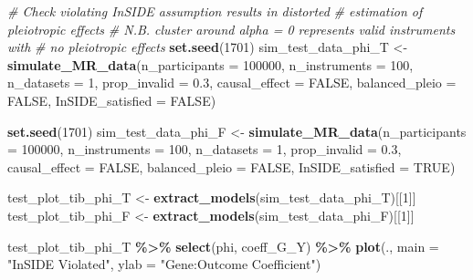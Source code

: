 \documentclass[
]{article}
\newenvironment{Shaded}{\begin{snugshade}}{\end{snugshade}}
\newcommand{\AttributeTok}[1]{\textcolor[rgb]{0.13,0.29,0.53}{#1}}
\newcommand{\CommentTok}[1]{\textcolor[rgb]{0.56,0.35,0.01}{\textit{#1}}}
\newcommand{\ConstantTok}[1]{\textcolor[rgb]{0.56,0.35,0.01}{#1}}
\newcommand{\DecValTok}[1]{\textcolor[rgb]{0.00,0.00,0.81}{#1}}
\newcommand{\FloatTok}[1]{\textcolor[rgb]{0.00,0.00,0.81}{#1}}
\newcommand{\FunctionTok}[1]{\textcolor[rgb]{0.13,0.29,0.53}{\textbf{#1}}}
\newcommand{\NormalTok}[1]{#1}
\newcommand{\OtherTok}[1]{\textcolor[rgb]{0.56,0.35,0.01}{#1}}
\newcommand{\SpecialCharTok}[1]{\textcolor[rgb]{0.81,0.36,0.00}{\textbf{#1}}}
\newcommand{\StringTok}[1]{\textcolor[rgb]{0.31,0.60,0.02}{#1}}
\begin{document}
\begin{Shaded}
\begin{Highlighting}[]
\CommentTok{\# Check violating InSIDE assumption results in distorted}
\CommentTok{\# estimation of pleiotropic effects}
\CommentTok{\# N.B. cluster around alpha = 0 represents valid instruments with}
\CommentTok{\# no pleiotropic effects}
 \FunctionTok{set.seed}\NormalTok{(}\DecValTok{1701}\NormalTok{)}
\NormalTok{ sim\_test\_data\_phi\_T }\OtherTok{\textless{}{-}} \FunctionTok{simulate\_MR\_data}\NormalTok{(}\AttributeTok{n\_participants =} \DecValTok{100000}\NormalTok{,}
                                         \AttributeTok{n\_instruments =} \DecValTok{100}\NormalTok{,}
                                         \AttributeTok{n\_datasets =} \DecValTok{1}\NormalTok{,}
                                         \AttributeTok{prop\_invalid =} \FloatTok{0.3}\NormalTok{,}
                                         \AttributeTok{causal\_effect =} \ConstantTok{FALSE}\NormalTok{,}
                                         \AttributeTok{balanced\_pleio =} \ConstantTok{FALSE}\NormalTok{,}
                                         \AttributeTok{InSIDE\_satisfied =} \ConstantTok{FALSE}\NormalTok{)}

 \FunctionTok{set.seed}\NormalTok{(}\DecValTok{1701}\NormalTok{)}
\NormalTok{ sim\_test\_data\_phi\_F }\OtherTok{\textless{}{-}} \FunctionTok{simulate\_MR\_data}\NormalTok{(}\AttributeTok{n\_participants =} \DecValTok{100000}\NormalTok{,}
                                         \AttributeTok{n\_instruments =} \DecValTok{100}\NormalTok{,}
                                         \AttributeTok{n\_datasets =} \DecValTok{1}\NormalTok{,}
                                         \AttributeTok{prop\_invalid =} \FloatTok{0.3}\NormalTok{,}
                                         \AttributeTok{causal\_effect =} \ConstantTok{FALSE}\NormalTok{,}
                                         \AttributeTok{balanced\_pleio =} \ConstantTok{FALSE}\NormalTok{,}
                                         \AttributeTok{InSIDE\_satisfied =} \ConstantTok{TRUE}\NormalTok{)}


\NormalTok{ test\_plot\_tib\_phi\_T }\OtherTok{\textless{}{-}} \FunctionTok{extract\_models}\NormalTok{(sim\_test\_data\_phi\_T)[[}\DecValTok{1}\NormalTok{]]}
\NormalTok{ test\_plot\_tib\_phi\_F }\OtherTok{\textless{}{-}} \FunctionTok{extract\_models}\NormalTok{(sim\_test\_data\_phi\_F)[[}\DecValTok{1}\NormalTok{]]}

\NormalTok{ test\_plot\_tib\_phi\_T }\SpecialCharTok{\%\textgreater{}\%}
   \FunctionTok{select}\NormalTok{(phi, coeff\_G\_Y) }\SpecialCharTok{\%\textgreater{}\%}
   \FunctionTok{plot}\NormalTok{(.,}
        \AttributeTok{main =} \StringTok{"InSIDE Violated"}\NormalTok{,}
        \AttributeTok{ylab =} \StringTok{"Gene:Outcome Coefficient"}\NormalTok{)}
\end{Highlighting}
\end{Shaded}
\end{document}
